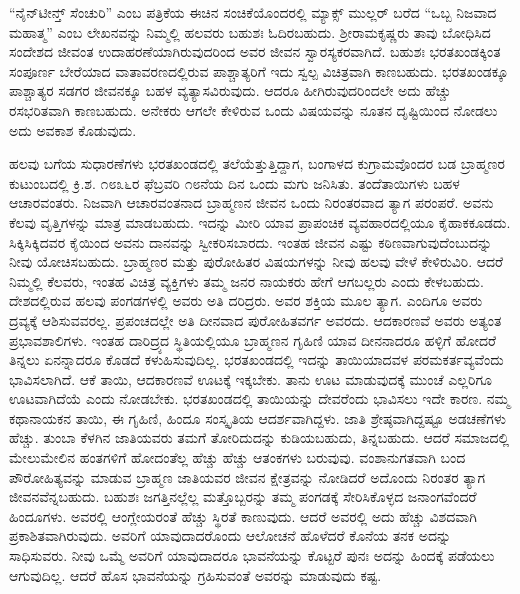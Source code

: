 “ನೈನ್​ಟೀನ್ತ್​ ಸೆಂಚುರಿ” ಎಂಬ ಪತ್ರಿಕೆಯ ಈಚಿನ ಸಂಚಿಕೆಯೊಂದರಲ್ಲಿ ಮ್ಯಾಕ್ಸ್​ ಮುಲ್ಲರ್​ ಬರೆದ “ಒಬ್ಬ ನಿಜವಾದ ಮಹಾತ್ಮ” ಎಂಬ ಲೇಖನವನ್ನು ನಿಮ್ಮಲ್ಲಿ ಹಲವರು ಬಹುಶಃ ಓದಿರಬಹುದು. ಶ‍್ರೀರಾಮಕೃಷ್ಣರು ತಾವು ಬೋಧಿಸಿದ ಸಂದೇಶದ ಜೀವಂತ ಉದಾಹರಣೆಯಾಗಿರುವುದರಿಂದ ಅವರ ಜೀವನ ಸ್ವಾರಸ್ಯಕರವಾಗಿದೆ. ಬಹುಶಃ ಭರತಖಂಡಕ್ಕಿಂತ ಸಂಪೂರ್ಣ ಬೇರೆಯಾದ ವಾತಾವರಣದಲ್ಲಿರುವ ಪಾಶ್ಚಾತ್ಯರಿಗೆ ಇದು ಸ್ವಲ್ಪ ವಿಚಿತ್ರವಾಗಿ ಕಾಣಬಹುದು. ಭರತಖಂಡಕ್ಕೂ ಪಾಶ್ಚಾತ್ಯರ ಸಡಗರ ಜೀವನಕ್ಕೂ ಬಹಳ ವ್ಯತ್ಯಾಸವಿರುವುದು. ಆದರೂ ಹೀಗಿರುವುದರಿಂದಲೇ ಅದು ಹೆಚ್ಚು ರಸಭರಿತವಾಗಿ ಕಾಣಬಹುದು. ಅನೇಕರು ಆಗಲೇ ಕೇಳಿರುವ ಒಂದು ವಿಷಯವನ್ನು ನೂತನ ದೃಷ್ಟಿಯಿಂದ ನೋಡಲು ಅದು ಅವಕಾಶ ಕೊಡುವುದು.

ಹಲವು ಬಗೆಯ ಸುಧಾರಣೆಗಳು ಭರತಖಂಡದಲ್ಲಿ ತಲೆಯೆತ್ತುತ್ತಿದ್ದಾಗ, ಬಂಗಾಳದ ಕುಗ್ರಾಮವೊಂದರ ಬಡ ಬ್ರಾಹ್ಮಣರ ಕುಟುಂಬದಲ್ಲಿ ಕ್ರಿ.ಶ. ೧೮೩೬ರ ಫೆಬ್ರವರಿ ೧೮ನೆಯ ದಿನ ಒಂದು ಮಗು ಜನಿಸಿತು. ತಂದೆತಾಯಿಗಳು ಬಹಳ ಆಚಾರವಂತರು. ನಿಜವಾಗಿ ಆಚಾರವಂತನಾದ ಬ್ರಾಹ್ಮಣನ ಜೀವನ ಒಂದು ನಿರಂತರವಾದ ತ್ಯಾಗ ಪರಂಪರೆ. ಅವನು ಕೆಲವು ವೃತ್ತಿಗಳನ್ನು ಮಾತ್ರ ಮಾಡಬಹುದು. ಇದನ್ನು ಮೀರಿ ಯಾವ ಪ್ರಾಪಂಚಿಕ ವ್ಯವಹಾರದಲ್ಲಿಯೂ ಕೈಹಾಕಕೂಡದು. ಸಿಕ್ಕಿಸಿಕ್ಕಿದವರ ಕೈಯಿಂದ ಅವನು ದಾನವನ್ನು ಸ್ವೀಕರಿಸಬಾರದು. ಇಂತಹ ಜೀವನ ಎಷ್ಟು ಕಠಿಣವಾಗುವುದೆಂಬುದನ್ನು ನೀವು ಯೋಚಿಸಬಹುದು. ಬ್ರಾಹ್ಮಣರ ಮತ್ತು ಪುರೋಹಿತರ ವಿಷಯಗಳನ್ನು ನೀವು ಹಲವು ವೇಳೆ ಕೇಳಿರುವಿರಿ. ಆದರೆ ನಿಮ್ಮಲ್ಲಿ ಕೆಲವರು, ಇಂತಹ ವಿಚಿತ್ರ ವ್ಯಕ್ತಿಗಳು ತಮ್ಮ ಜನರ ನಾಯಕರು ಹೇಗೆ ಆಗಬಲ್ಲರು ಎಂದು ಕೇಳಬಹುದು. ದೇಶದಲ್ಲಿರುವ ಹಲವು ಪಂಗಡಗಳಲ್ಲಿ ಅವರು ಅತಿ ದರಿದ್ರರು. ಅವರ ಶಕ್ತಿಯ ಮೂಲ ತ್ಯಾಗ. ಎಂದಿಗೂ ಅವರು ದ್ರವ್ಯಕ್ಕೆ ಆಶಿಸುವವರಲ್ಲ. ಪ್ರಪಂಚದಲ್ಲೇ ಅತಿ ದೀನವಾದ ಪುರೋಹಿತವರ್ಗ ಅವರದು. ಆದಕಾರಣವೆ ಅವರು ಅತ್ಯಂತ ಪ್ರಭಾವಶಾಲಿಗಳು. ಇಂತಹ ದಾರಿದ್ರ್ಯದ ಸ್ಥಿತಿಯಲ್ಲಿಯೂ ಬ್ರಾಹ್ಮಣನ ಗೃಹಿಣಿ ಯಾವ ದೀನನಾದರೂ ಹಳ್ಳಿಗೆ ಹೋದರೆ ತಿನ್ನಲು ಏನನ್ನಾದರೂ ಕೊಡದೆ ಕಳುಹಿಸುವುದಿಲ್ಲ. ಭರತಖಂಡದಲ್ಲಿ ಇದನ್ನು ತಾಯಿಯಾದವಳ ಪರಮಕರ್ತವ್ಯವೆಂದು ಭಾವಿಸಲಾಗಿದೆ. ಆಕೆ ತಾಯಿ, ಆದಕಾರಣವೆ ಊಟಕ್ಕೆ ಇಕ್ಕಬೇಕು. ತಾನು ಊಟ ಮಾಡುವುದಕ್ಕೆ ಮುಂಚೆ ಎಲ್ಲರಿಗೂ ಊಟವಾಗಿದೆಯೆ ಎಂದು ನೋಡಬೇಕು. ಭರತಖಂಡದಲ್ಲಿ ತಾಯಿಯನ್ನು ದೇವರೆಂದು ಭಾವಿಸಲು ಇದೇ ಕಾರಣ. ನಮ್ಮ ಕಥಾನಾಯಕನ ತಾಯಿ, ಈ ಗೃಹಿಣಿ, ಹಿಂದೂ ಸಂಸ್ಕೃತಿಯ ಆದರ್ಶವಾಗಿದ್ದಳು. ಜಾತಿ ಶ್ರೇಷ್ಠವಾಗಿದ್ದಷ್ಟೂ ಅಡಚಣೆಗಳು ಹೆಚ್ಚು. ತುಂಬಾ ಕೆಳಗಿನ ಜಾತಿಯವರು ತಮಗೆ ತೋರಿದುದನ್ನು ಕುಡಿಯಬಹುದು, ತಿನ್ನಬಹುದು. ಆದರೆ ಸಮಾಜದಲ್ಲಿ ಮೇಲುಮೇಲಿನ ಹಂತಗಳಿಗೆ ಹೋದಂತೆಲ್ಲ ಹೆಚ್ಚು ಹೆಚ್ಚು ಆತಂಕಗಳು ಬರುವುವು. ವಂಶಾನುಗತವಾಗಿ ಬಂದ ಪೌರೋಹಿತ್ಯವನ್ನು ಮಾಡುವ ಬ್ರಾಹ್ಮಣ ಜಾತಿಯವರ ಜೀವನ ಕ್ಷೇತ್ರವನ್ನು ನೋಡಿದರೆ ಅದೊಂದು ನಿರಂತರ ತ್ಯಾಗ ಜೀವನವೆನ್ನಬಹುದು. ಬಹುಶಃ ಜಗತ್ತಿನಲ್ಲೆಲ್ಲ ಮತ್ತೊಬ್ಬರನ್ನು ತಮ್ಮ ಪಂಗಡಕ್ಕೆ ಸೇರಿಸಿಕೊಳ್ಳದ ಜನಾಂಗವೆಂದರೆ ಹಿಂದೂಗಳು. ಅವರಲ್ಲಿ ಆಂಗ್ಲೇಯರಂತೆ ಹೆಚ್ಚು ಸ್ಥಿರತೆ ಕಾಣುವುದು. ಆದರೆ ಅವರಲ್ಲಿ ಅದು ಹೆಚ್ಚು ವಿಶದವಾಗಿ ಪ್ರಕಾಶಿತವಾಗಿರುವುದು. ಅವರಿಗೆ ಯಾವುದಾದರೊಂದು ಆಲೋಚನೆ ಹೊಳೆದರೆ ಕೊನೆಯ ತನಕ ಅದನ್ನು ಸಾಧಿಸುವರು. ನೀವು ಒಮ್ಮೆ ಅವರಿಗೆ ಯಾವುದಾದರೂ ಭಾವನೆಯನ್ನು ಕೊಟ್ಟರೆ ಪುನಃ ಅದನ್ನು ಹಿಂದಕ್ಕೆ ಪಡೆಯಲು ಆಗುವುದಿಲ್ಲ. ಆದರೆ ಹೊಸ ಭಾವನೆಯನ್ನು ಗ್ರಹಿಸುವಂತೆ ಅವರನ್ನು ಮಾಡುವುದು ಕಷ್ಟ.


